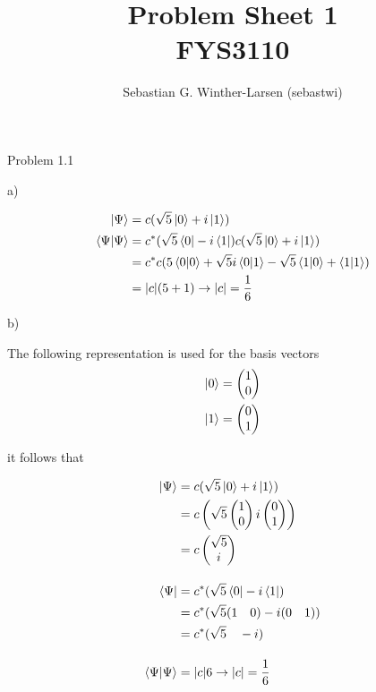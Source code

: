 \documentclass{article}
\title{Problem Sheet 1 \\
\large{FYS3110}}
\author{Sebastian G. Winther-Larsen (sebastwi)}
\begin{document}
\maketitle

Problem 1.1

\hspace{1cm}

a)

\begin{align*}
\ket{\Psi} 		&= c(\sqrt{5}\ket{0}+i\ket{1})\\
\braket{\Psi} 	&= c^*(\sqrt{5}\bra{0}-i\bra{1}) c(\sqrt{5}\ket{0}+i\ket{1})\\
				&= c^*c(5\braket{0}+\sqrt{5}i\braket{0}{1}-\sqrt{5}\braket{1}{0}+\braket{1})\\
				&= \abs{c}(5+1) \rightarrow \abs{c}=\frac{1}{6}
\end{align*}

\hspace{1cm}

b)

The following representation is used for the basis vectors
\begin{align*}
\ket{0} &= \begin{pmatrix} 1 \\ 0 \end{pmatrix}\\
\ket{1} &= \begin{pmatrix} 0 \\ 1 \end{pmatrix}
\end{align*}

it follows that

\begin{align*}
\ket{\Psi} 	&= c(\sqrt{5}\ket{0}+i\ket{1}) \\
			&= c\left(
				\sqrt{5} \begin{pmatrix} 1 \\ 0 \end{pmatrix}
				i \begin{pmatrix} 0 \\ 1 \end{pmatrix}
				\right) \\
			&= c \begin{pmatrix} \sqrt{5} \\ i \end{pmatrix} \\[10pt]
\bra{\Psi} 	&= c^*(\sqrt{5}\bra{0}-i\bra{1}) \\
			&= c^*( \sqrt{5} ( 1 \quad 0 ) -i ( 0 \quad 1 )) \\
			&= c^* ( \sqrt{5} \quad  -i ) \\[10pt]
\braket{\Psi} &= \abs{c}6 \rightarrow \abs{c}=\frac{1}{6}
\end{align*}
\end{document}
